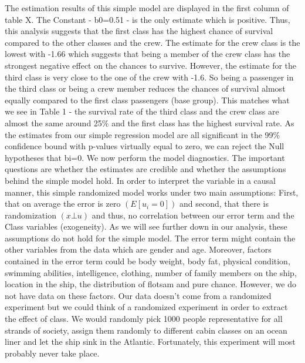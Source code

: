 \documentclass[
]{article}
\begin{document}
The estimation results of this simple model are displayed in the first
column of table X. The Constant - b0=0.51 - is the only estimate which
is positive. Thus, this analysis suggests that the first class has the
highest chance of survival compared to the other classes and the crew.
The estimate for the crew class is the lowest with -1.66 which suggests
that being a member of the crew class has the strongest negative effect
on the chances to survive. However, the estimate for the third class is
very close to the one of the crew with -1.6. So being a passenger in the
third class or being a crew member reduces the chances of survival
almost equally compared to the first class passengers (base group). This
matches what we see in Table 1 - the survival rate of the third class
and the crew class are almost the same around 25\% and the first class
has the highest survival rate. As the estimates from our simple
regression model are all significant in the 99\% confidence bound with
p-values virtually equal to zero, we can reject the Null hypotheses that
bi=0. We now perform the model diagnostics. The important questions are
whether the estimates are credible and whether the assumptions behind
the simple model hold. In order to interpret the variable in a causal
manner, this simple randomized model works under two main assumptions:
First, that on average the error is zero \((E[u_i = 0])\) and second,
that there is randomization \((x \bot u)\) and thus, no correlation
between our error term and the Class variables (exogeneity). As we will
see further down in our analysis, these assumptions do not hold for the
simple model. The error term might contain the other variables from the
data which are gender and age. Moreover, factors contained in the error
term could be body weight, body fat, physical condition, swimming
abilities, intelligence, clothing, number of family members on the ship,
location in the ship, the distribution of flotsam and pure chance.
However, we do not have data on these factors. Our data doesn't come
from a randomized experiment but we could think of a randomized
experiment in order to extract the effect of class. We would randomly
pick 1000 people representative for all strands of society, assign them
randomly to different cabin classes on an ocean liner and let the ship
sink in the Atlantic. Fortunately, this experiment will most probably
never take place.
\end{document}
